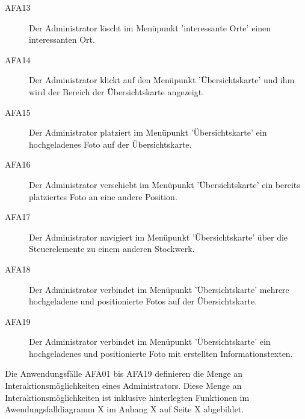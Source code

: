 \begin{description}
  \item[AFA13] Der Administrator löscht im Menüpunkt 'interessante Orte' einen interessanten Ort.
  \item[AFA14] Der Administrator klickt auf den Menüpunkt 'Übersichtskarte' und ihm wird der Bereich der Übersichtskarte angezeigt.
  \item[AFA15] Der Administrator platziert im Menüpunkt 'Übersichtskarte' ein hochgeladenes Foto auf der Übersichtskarte.
  \item[AFA16] Der Administrator verschiebt im Menüpunkt 'Übersichtskarte' ein bereits platziertes Foto an eine andere Position.
  \item[AFA17] Der Administrator navigiert im Menüpunkt 'Übersichtskarte' über die Steuerelemente zu einem anderen Stockwerk.
  \item[AFA18] Der Administrator verbindet im Menüpunkt 'Übersichtskarte' mehrere hochgeladene und positionierte Fotos auf der Übersichtskarte.
  \item[AFA19] Der Administrator verbindet im Menüpunkt 'Übersichtskarte' ein hochgeladenes und positionierte Foto mit erstellten Informationstexten.
\end{description}

Die Anwendungsfälle AFA01 bis AFA19 definieren die Menge an Interaktionsmöglichkeiten eines Administrators. Diese Menge
an Interaktionsmöglichkeiten ist inklusive hinterlegten Funktionen im Awendungsfalldiagramm X im Anhang X auf Seite X abgebildet.